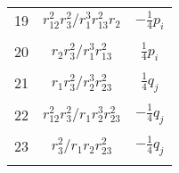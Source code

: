 \documentclass[Dissertation.tex]{subfiles}
\begin{document}
\begin{center}
\begin{longtable}{|c|c|c|}
19  & $r_{12}^2 r_3^2/r_1^3 r_{13}^2 r_2$  & $-\frac{1}{4}p_i$ \\
&  &  \\
20  & $r_2 r_3^2/r_1^3 r_{13}^2$  & $\frac{1}{4}p_i$ \\
&  &  \\
21  & $r_1 r_3^2/r_2^3 r_{23}^2$  & $\frac{1}{4}q_j$ \\
&  &  \\
22  & $r_{12}^2 r_3^2/r_1 r_2^3 r_{23}^2$  & $-\frac{1}{4}q_j$ \\
&  &  \\
23  & $r_3^2/r_1 r_2 r_{23}^2$  & $-\frac{1}{4}q_j$ \\
&  &  \\
\end{longtable}
\end{center}


\biblio
\end{document}
